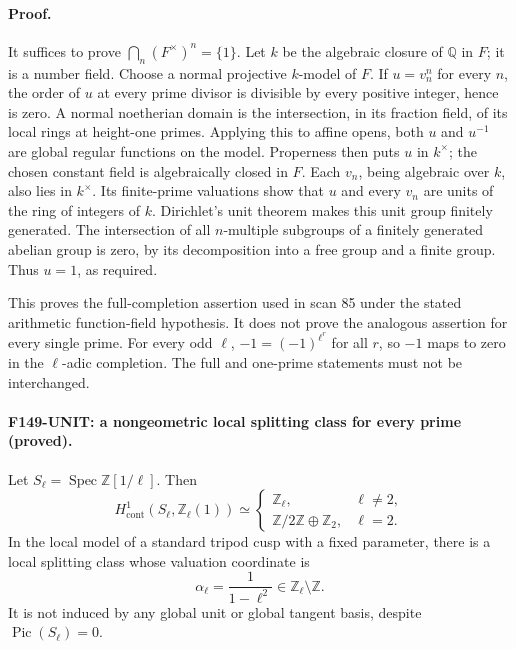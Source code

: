 \documentclass[11pt,a4paper]{article}
\theoremstyle{definition}
\begin{document}
\paragraph{Proof.}
It suffices to prove \(\bigcap_n(F^\times)^n=\{1\}\).  Let \(k\) be the
algebraic closure of \(\mathbb Q\) in \(F\); it is a number field.
Choose a normal projective \(k\)-model of \(F\).  If \(u=v_n^n\) for
every \(n\), the order of \(u\) at every prime divisor is divisible by
every positive integer, hence is zero.  A normal noetherian domain is
the intersection, in its fraction field, of its local rings at
height-one primes.  Applying this to affine opens, both \(u\) and
\(u^{-1}\) are global regular functions on the model.  Properness then
puts \(u\) in \(k^\times\); the chosen constant field is algebraically
closed in \(F\).  Each \(v_n\), being algebraic over \(k\), also lies in
\(k^\times\).  Its finite-prime valuations show that \(u\) and every
\(v_n\) are units of the ring of integers of \(k\).  Dirichlet's unit
theorem makes this unit group finitely generated.  The intersection
of all \(n\)-multiple subgroups of a finitely generated abelian group
is zero, by its decomposition into a free group and a finite group.
Thus \(u=1\), as required.

This proves the full-completion assertion used in scan 85 under the
stated arithmetic function-field hypothesis.  It does not prove the
analogous assertion for every single prime.  For every odd \(\ell\),
\(-1=(-1)^{\ell^r}\) for all \(r\), so \(-1\) maps to zero in the
\(\ell\)-adic completion.  The full and one-prime statements must not
be interchanged.

\paragraph{F149-UNIT: a nongeometric local splitting class for every prime
(proved).}
Let \(S_\ell=\operatorname{Spec}\mathbb Z[1/\ell]\).  Then
\[
 H^1_{\mathrm{cont}}(S_\ell,\mathbb Z_\ell(1))
 \simeq
 \begin{cases}
 \mathbb Z_\ell,&\ell\ne2,\\
 \mathbb Z/2\mathbb Z\oplus\mathbb Z_2,&\ell=2.
 \end{cases}
\]
In the local model of a standard tripod cusp with a fixed parameter,
there is a local splitting class whose valuation coordinate is
\[
 \alpha_\ell=\frac{1}{1-\ell^2}\in\mathbb Z_\ell\setminus\mathbb Z.
 \tag{F149-UNIT}
\]
It is not induced by any global unit or global tangent basis, despite
\(\operatorname{Pic}(S_\ell)=0\).
\end{document}
